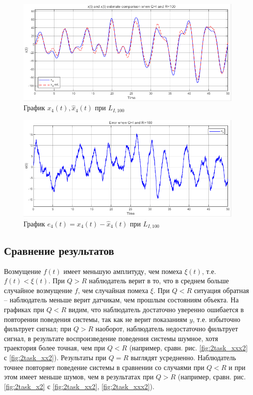 \documentclass[a4paper, 12pt]{article}
\begin{document}
    \begin{figure}[H]
        \centering
        \includegraphics[scale=0.75]{2task_xxx4.png}
        \captionsetup{skip=0pt}
        \caption{График $x_4(t),\hat{x}_4(t)$ при $L_{I,100}$}
        \label{fig:2task_xxx4}
    \end{figure}
    \begin{figure}[H]
        \centering
        \includegraphics[scale=0.75]{2task_eee4.png}
        \captionsetup{skip=0pt}
        \caption{График $e_4(t)=x_4(t)-\hat{x}_4(t)$ при $L_{I,100}$}
        \label{fig:2task_eee4}
    \end{figure}


    \subsection{Сравнение результатов}
    Возмущение $f(t)$ имеет меньшую амплитуду, чем помеха $\xi(t)$, т.е. $f(t)<\xi(t)$.
    При $Q>R$ наблюдатель верит в то, что в среднем больше случайное возмущение $f$,
    чем случайная помеха $\xi$. При $Q<R$ ситуация обратная
    -- наблюдатель меньше верит датчикам, чем прошлым состояниям объекта.
    На графиках при $Q<R$ видим, что наблюдатель достаточно уверенно ошибается
    в повторении поведения системы, так как не верит показаниям $y$,
    т.е. избыточно фильтрует сигнал; при $Q>R$ наоборот, наблюдатель недостаточно фильтрует
    сигнал, в результате воспроизведение поведения системы шумное, хотя траектория более точная,
    чем при $Q<R$ (например, сравн. рис. \ref{fig:2task_xxx2} с \ref{fig:2task_xx2}).
    Результаты при $Q=R$ выглядят усредненно. Наблюдатель точнее повторяет
    поведение системы в сравнении со случаями при $Q<R$ и при этом имеет
    меньше шумов, чем в результатах при $Q>R$ (например, сравн. рис. \ref{fig:2task_x2} с \ref{fig:2task_xx2}, \ref{fig:2task_xxx2}).
\end{document}
